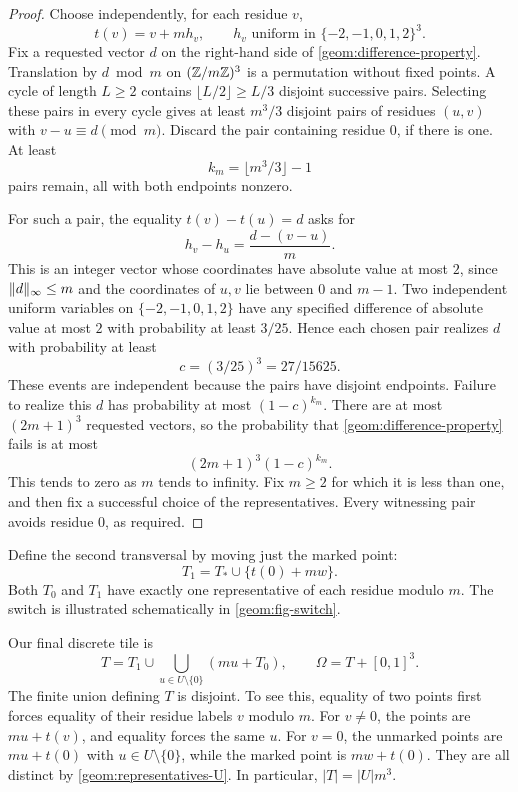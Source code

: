 \begin{proof}
Choose independently, for each residue $v$,
\[
 t(v)=v+mh_v,\qquad
 h_v\text{ uniform in }\{-2,-1,0,1,2\}^3.
\]
Fix a requested vector $d$ on the right-hand side of
\cref{geom:difference-property}.  Translation by $d\bmod m$ on
$(\mathbb Z/m\mathbb Z)^3$ is a permutation without fixed points.  A cycle of
length $L\geq2$ contains $\lfloor L/2\rfloor\geq L/3$ disjoint
successive pairs.  Selecting these pairs in every cycle gives at
least $m^3/3$ disjoint pairs of residues $(u,v)$ with
$v-u\equiv d\pmod m$.  Discard the pair containing residue $0$, if
there is one.  At least
\[
 k_m=\lfloor m^3/3\rfloor-1
\]
pairs remain, all with both endpoints nonzero.

For such a pair, the equality $t(v)-t(u)=d$ asks for
\[
 h_v-h_u=\frac{d-(v-u)}m.
\]
This is an integer vector whose coordinates have absolute value at
most $2$, since $\lVert d\rVert_\infty\leq m$ and the coordinates of $u,v$
lie between $0$ and $m-1$.  Two independent uniform variables on
$\{-2,-1,0,1,2\}$ have any specified difference of absolute value at
most $2$ with probability at least $3/25$.  Hence each chosen pair
realizes $d$ with probability at least
\[
 c=(3/25)^3=27/15625.
\]
These events are independent because the pairs have disjoint
endpoints.  Failure to realize this $d$ has probability at most
$(1-c)^{k_m}$.  There are at most $(2m+1)^3$ requested vectors, so
the probability that \cref{geom:difference-property} fails is at most
\[
 (2m+1)^3(1-c)^{k_m}.
\]
This tends to zero as $m$ tends to infinity.  Fix $m\geq2$ for which
it is less than one, and then fix a successful choice of the
representatives.  Every witnessing pair avoids residue $0$, as
required.
\end{proof}

Define the second transversal by moving just the marked point:
\[
 T_1=T_*\cup\{t(0)+mw\}.
\]
Both $T_0$ and $T_1$ have exactly one representative of each residue
modulo $m$.  The switch is illustrated schematically in
\cref{geom:fig-switch}.



Our final discrete tile is
\begin{equation}
 T=T_1\cup\bigcup_{u\in U\setminus\{0\}}(mu+T_0),
 \qquad \Omega=T+[0,1]^3.
 \label{geom:large-tile}
\end{equation}
The finite union defining $T$ is disjoint.  To see this, equality of
two points first forces equality of their residue labels $v$ modulo
$m$.  For $v\ne0$, the points are $mu+t(v)$, and equality forces
the same $u$.  For $v=0$, the unmarked points are
$mu+t(0)$ with $u\in U\setminus\{0\}$, while the marked point is
$mw+t(0)$.  They are all distinct by
\cref{geom:representatives-U}.  In particular, $|T|=|U|m^3$.

